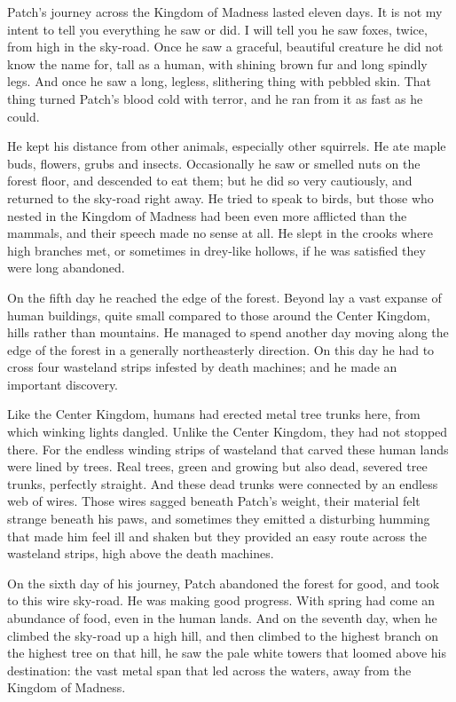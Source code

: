 \documentclass[12pt]{book}
\begin{document}
 Patch's journey across the Kingdom of Madness lasted eleven days. It is not my intent to tell you everything he saw or did. I will tell you he saw foxes, twice, from high in the sky-road. Once he saw a graceful, beautiful creature he did not know the name for, tall as a human, with shining brown fur and long spindly legs. And once he saw a long, legless, slithering thing with pebbled skin. That thing turned Patch's blood cold with terror, and he ran from it as fast as he could.\par
 He kept his distance from other animals, especially other squirrels. He ate maple buds, flowers, grubs and insects. Occasionally he saw or smelled nuts on the forest floor, and descended to eat them; but he did so very cautiously, and returned to the sky-road right away. He tried to speak to birds, but those who nested in the Kingdom of Madness had been even more afflicted than the mammals, and their speech made no sense at all. He slept in the crooks where high branches met, or sometimes in drey-like hollows, if he was satisfied they were long abandoned.\par
 On the fifth day he reached the edge of the forest. Beyond lay a vast expanse of human buildings, quite small compared to those around the Center Kingdom, hills rather than mountains. He managed to spend another day moving along the edge of the forest in a generally northeasterly direction. On this day he had to cross four wasteland strips infested by death machines; and he made an important discovery.\par
 Like the Center Kingdom, humans had erected metal tree trunks here, from which winking lights dangled. Unlike the Center Kingdom, they had not stopped there. For the endless winding strips of wasteland that carved these human lands were lined by trees. Real trees, green and growing %
 but also dead, severed tree trunks, perfectly straight. And these dead trunks were connected by an endless web of wires. Those wires sagged beneath Patch's weight, their material felt strange beneath his paws, and sometimes they emitted a disturbing humming that made him feel ill and shaken %
 but they provided an easy route across the wasteland strips, high above the death machines.\par
 On the sixth day of his journey, Patch abandoned the forest for good, and took to this wire sky-road. He was making good progress. With spring had come an abundance of food, even in the human lands. And on the seventh day, when he climbed the sky-road up a high hill, and then climbed to the highest branch on the highest tree on that hill, he saw the pale white towers that loomed above his destination: the vast metal span that led across the waters, away from the Kingdom of Madness.\par
\end{document}
